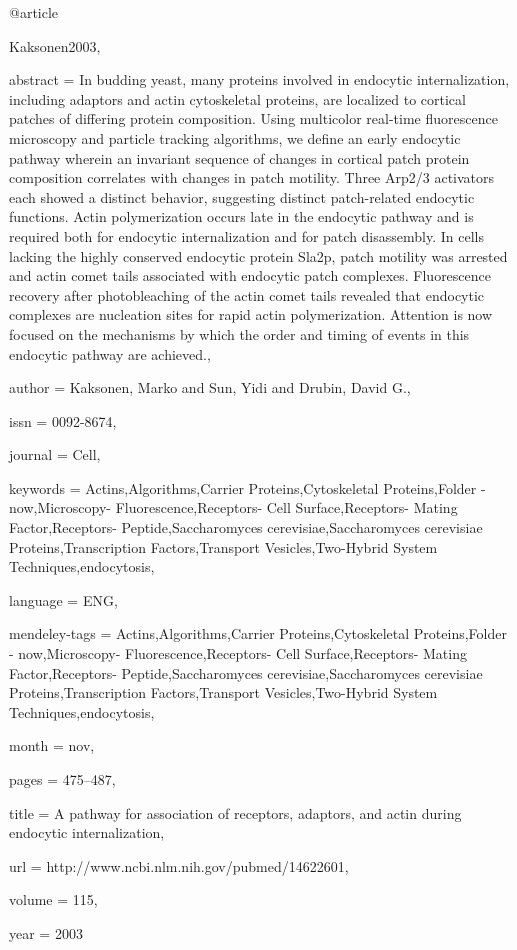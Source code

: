 @article{Kaksonen2003,

abstract = {In budding yeast, many proteins involved in endocytic internalization, including adaptors and actin cytoskeletal proteins, are localized to cortical patches of differing protein composition. Using multicolor real-time fluorescence microscopy and particle tracking algorithms, we define an early endocytic pathway wherein an invariant sequence of changes in cortical patch protein composition correlates with changes in patch motility. Three Arp2/3 activators each showed a distinct behavior, suggesting distinct patch-related endocytic functions. Actin polymerization occurs late in the endocytic pathway and is required both for endocytic internalization and for patch disassembly. In cells lacking the highly conserved endocytic protein Sla2p, patch motility was arrested and actin comet tails associated with endocytic patch complexes. Fluorescence recovery after photobleaching of the actin comet tails revealed that endocytic complexes are nucleation sites for rapid actin polymerization. Attention is now focused on the mechanisms by which the order and timing of events in this endocytic pathway are achieved.},

author = {Kaksonen, Marko and Sun, Yidi and Drubin, David G.},

issn = {0092-8674},

journal = {Cell},

keywords = {Actins,Algorithms,Carrier Proteins,Cytoskeletal Proteins,Folder - now,Microscopy- Fluorescence,Receptors- Cell Surface,Receptors- Mating Factor,Receptors- Peptide,Saccharomyces cerevisiae,Saccharomyces cerevisiae Proteins,Transcription Factors,Transport Vesicles,Two-Hybrid System Techniques,endocytosis},

language = {ENG},

mendeley-tags = {Actins,Algorithms,Carrier Proteins,Cytoskeletal Proteins,Folder - now,Microscopy- Fluorescence,Receptors- Cell Surface,Receptors- Mating Factor,Receptors- Peptide,Saccharomyces cerevisiae,Saccharomyces cerevisiae Proteins,Transcription Factors,Transport Vesicles,Two-Hybrid System Techniques,endocytosis},

month = {nov},

pages = {475--487},

title = {{A pathway for association of receptors, adaptors, and actin during endocytic internalization}},

url = {http://www.ncbi.nlm.nih.gov/pubmed/14622601},

volume = {115},

year = {2003}

}

